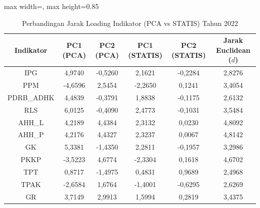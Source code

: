 \begin{table}[H]
\centering
\caption{Perbandingan Jarak Loading Indikator (PCA vs STATIS) Tahun 2022} \label{tab:app2jarak_loading_2022}
\begin{adjustbox}{max width=\textwidth, max height=0.85\textheight}
\begin{tabular}{|c|c|c|c|c|c|}
\hline
\textbf{Indikator} & \textbf{PC1 (PCA)} & \textbf{PC2 (PCA)} & \textbf{PC1 (STATIS)} & \textbf{PC2 (STATIS)} & \textbf{Jarak Euclidean ($d$)} \\
\hline
IPG & 4,9740 & -0,5260 & 2,1621 & -0,2284 & 2,8276 \\
PPM & -4,6596 & 2,5454 & -2,2650 & 0,1241 & 3,4054 \\
PDRB\_ADHK & 4,4839 & -0,3791 & 1,8838 & -0,1175 & 2,6132 \\
RLS & 6,0125 & -0,4090 & 2,4773 & -0,1031 & 3,5484 \\
AHH\_L & 4,2189 & 4,4384 & 2,3132 & 0,0230 & 4,8092 \\
AHH\_P & 4,2176 & 4,4327 & 2,3237 & 0,0067 & 4,8142 \\
GK & 5,3381 & -1,4350 & 2,2811 & -0,1957 & 3,2986 \\
PKKP & -3,5223 & 4,6774 & -2,3304 & 0,1618 & 4,6702 \\
TPT & 0,8717 & -1,4975 & 0,4831 & 0,9689 & 2,4968 \\
TPAK & -2,6584 & 1,6764 & -1,4001 & -0,6295 & 2,6269 \\
GR & 3,7149 & 2,9913 & 1,5994 & 0,2819 & 3,4375 \\
\hline
\end{tabular}
\end{adjustbox}
\end{table}